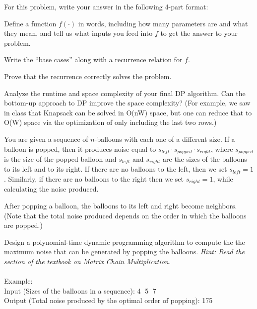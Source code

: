 \documentclass{article}
\begin{document}
For this problem, write your answer in the following 4-part format:
\begin{subparts}
\item Define a function $f(\cdot)$ in words, including how many parameters are and what they mean, and tell us what inputs you feed into $f$ to get the answer to your problem.
\item Write the ``base cases'' along with a recurrence relation for $f$.
\item Prove that the recurrence correctly solves the problem.
\item Analyze the runtime and space complexity of your final DP algorithm. Can the bottom-up approach to DP improve the space complexity? (For example, we saw in class that Knapsack can be solved in O(nW) space, but one can reduce that to O(W) space via the optimization of only including the last two rows.)
\end{subparts}

 You are given a
	sequence of $n$-balloons with each one of a different size. If
	a balloon is popped, then it produces noise equal to $s_{left}
	\cdot s_{popped} \cdot s_{right}$, where $s_{popped}$ is the
	size of the popped balloon and $s_{left}$ and $s_{right}$ are
	the sizes of the balloons to its left and to its right. If
	there are no balloons to the left, then we set $s_{left} = 1$. 
	Similarly, if there are no balloons to the right then we set
	$s_{right} = 1$, while calculating the noise produced.

	After popping a balloon, the balloons to its left and right become neighbors. (Note that the total noise produced depends on the order in which the balloons are popped.)
     
     Design a polynomial-time dynamic programming algorithm to compute the the maximum
     noise that can be generated by popping the balloons. \textit{Hint: Read the section of the textbook on Matrix Chain Multiplication.}\\
 \\
 Example:\\
 Input (Sizes of the balloons in a sequence): \textcircled{4} \textcircled{5}  \textcircled{7} \\
 Output (Total noise produced by the optimal order of popping): 175 
\end{document}
